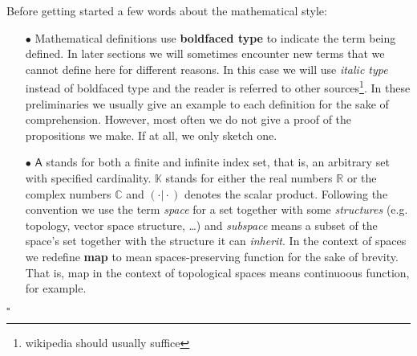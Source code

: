 \begin{rem}
\label{rem:style}
Before getting started a few words about the mathematical style: 
\begin{enumerate}
\item[$\bullet$]
  Mathematical definitions use \textbf{boldfaced type} to indicate the term being defined. In later sections we will sometimes encounter new terms that we cannot define here for different reasons. In this case we will use \textit{italic type} instead of boldfaced type and the reader is referred to other sources\footnote{wikipedia should usually suffice}. In these preliminaries we usually give an example to each definition for the sake of comprehension. However, most often we do not give a proof of the propositions we make. If at all, we only sketch one. 
\item[$\bullet$]
  $\mathsf{A}$ stands for both a finite and infinite index set, that is, an arbitrary set with specified cardinality. $\mathbb{K}$ stands for either the real numbers $\mathbb{R}$ or the complex numbers $\mathbb{C}$ and $(\cdot \vert \cdot)$ denotes the scalar product. Following the convention we use the term \textit{space} for a set together with some \textit{structures} (e.g. topology, vector space structure, \ldots) and \textit{subspace} means a subset of the space's set together with the structure it can \textit{inherit}. In the context of spaces we redefine \textbf{map} to mean spaces-preserving function for the sake of brevity. That is, map in the context of topological spaces means continuoous function, for example.
\end{enumerate}
\phantom{proven}
\hfill
$\square$
\end{rem}
